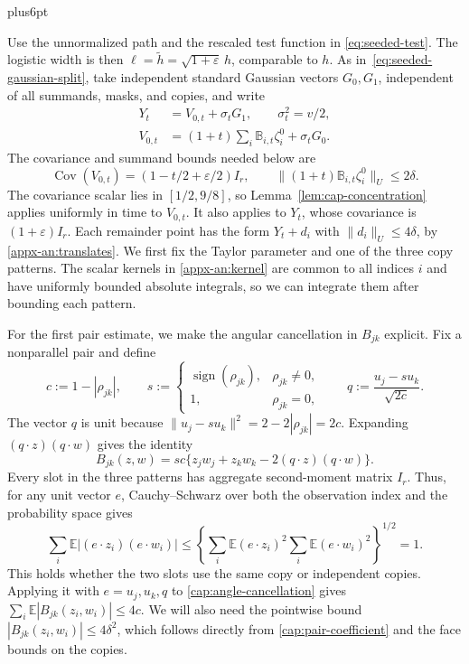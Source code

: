 \documentclass[11pt,letterpaper,twoside,leqno]{article}
\makeatletter
\theoremstyle{bookplain}
\theoremstyle{bookremark}
\renewenvironment{proof}[1][\proofname]{\par
  \pushQED{\qed}\normalfont\topsep6pt plus6pt\relax
  \trivlist\item[\hskip\labelsep\bfseries #1\@addpunct{.}]\ignorespaces
}{\popQED\endtrivlist\@endpefalse}
\newcommand{\E}{\mathbb E}
\newcommand{\Cov}{\operatorname{Cov}}
\makeatother
\begin{document}
\begin{proof}
Use the unnormalized path and the rescaled test function in
\eqref{eq:seeded-test}. The logistic width is then
$\ell=\widetilde h=\sqrt{1+\varepsilon}\,h$, comparable to $h$.
As in~\eqref{eq:seeded-gaussian-split}, take independent standard
Gaussian vectors $G_0,G_1$, independent of all summands, masks,
and copies, and write
\[
 \begin{aligned}
 Y_t&=V_{0,t}+\sigma_tG_1,\qquad \sigma_t^2=v/2,\\
 V_{0,t}&=(1+t)\sum_i\mathbb B_{i,t}\zeta_i^0+\sigma_tG_0.
 \end{aligned}
\]
The covariance and summand bounds needed below are
\[
 \Cov(V_{0,t})=(1-t/2+\varepsilon/2)I_r,
 \qquad \|(1+t)\mathbb B_{i,t}\zeta_i^0\|_U\le2\delta.
\]
The covariance scalar lies in $[1/2,9/8]$, so
Lemma~\ref{lem:cap-concentration} applies uniformly in time
to $V_{0,t}$. It also applies to $Y_t$, whose covariance is
$(1+\varepsilon)I_r$. Each remainder point has the form
$Y_t+d_i$ with $\|d_i\|_U\le4\delta$, by
\eqref{appx-an:translates}. We first fix the Taylor parameter
and one of the three copy patterns. The scalar kernels in
\eqref{appx-an:kernel} are common to all indices $i$ and have
uniformly bounded absolute integrals, so we can integrate them
after bounding each pattern.

For the first pair estimate, we make the angular cancellation
in $B_{jk}$ explicit. Fix a nonparallel pair and define
\[
 c:=1-|\rho_{jk}|,\qquad
 s:=\begin{cases}\operatorname{sign}(\rho_{jk}),&\rho_{jk}\ne0,\\
                 1,&\rho_{jk}=0,\end{cases}
 \qquad q:=\frac{u_j-su_k}{\sqrt{2c}}.
\]
The vector $q$ is unit because
$\|u_j-su_k\|^2=2-2|\rho_{jk}|=2c$.
Expanding $(q\cdot z)(q\cdot w)$ gives the identity
\begin{equation}
 B_{jk}(z,w)=sc\{z_jw_j+z_kw_k-2(q\cdot z)(q\cdot w)\}.
 \label{cap:angle-cancellation}
\end{equation}
Every slot in the three patterns has aggregate second-moment
matrix $I_r$. Thus, for any unit vector $e$, Cauchy--Schwarz
over both the observation index and the probability space gives
\[
 \sum_i\E|(e\cdot z_i)(e\cdot w_i)|
 \le\left\{\sum_i\E(e\cdot z_i)^2
             \sum_i\E(e\cdot w_i)^2\right\}^{1/2}=1.
\]
This holds whether the two slots use the same copy or independent
copies. Applying it with $e=u_j,u_k,q$ to
\eqref{cap:angle-cancellation} gives
$\sum_i\E|B_{jk}(z_i,w_i)|\le4c$.
We will also need the pointwise bound
$|B_{jk}(z_i,w_i)|\le4\delta^2$, which follows directly from
\eqref{cap:pair-coefficient} and the face bounds on the copies.


\end{proof}
\end{document}
